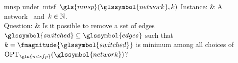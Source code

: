 \begin{problem}[framed]{\acrlong{mnsp}
    under~\gls{mtsf}~$\gls{mnsp}(\glssymbol{network},k)$} 
    Instance: & A network~ and~$k\in\mathbb{N}$.\\
    Question: & Is it possible to remove a set of edges~$
    \glssymbol{switched}\subseteq\glssymbol{edges}$
    such that $k = \fmagnitude{\glssymbol{switched}}$ is minimum among all
    choices of~$\opt_{\gls{mtsfp}}(\glssymbol{network})$?
\end{problem} 
